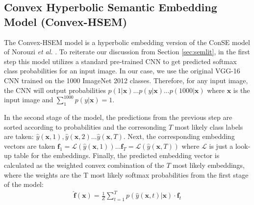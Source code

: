 \documentclass[12pt]{report}
\begin{document}
\subsection{Convex Hyperbolic Semantic Embedding Model (Convex-HSEM)}
The Convex-HSEM model is a hyperbolic embedding version of the ConSE model of Norouzi \textit{et al.} \cite{Norouzi2013}. To reiterate our discussion from Section \ref{sec:semlit}, in the first step this model utilizes a standard pre-trained CNN to get predicted softmax class probabilities for an input image. In our case, we use the original VGG-16 CNN trained on the 1000 ImageNet 2012 classes. Therefore, for any input image, the CNN will output probabilities $p(1|\mathbf{x}) \dots p(y|\mathbf{x}) \dots p(1000|\mathbf{x})$ where $\mathbf{x}$ is the input image and $\sum_1^{1000}p(y|\mathbf{x})=1$.

In the second stage of the model, the predictions from the previous step are sorted according to probabilities and the corresonding $T$ most likely class labels are taken: $\hat{y}(\mathbf{x}, 1),\hat{y}(\mathbf{x}, 2) \dots \hat{y}(\mathbf{x}, T)$. Next, the corresponding embedding vectors are taken $\mathbf{f}_1 = \mathcal{L}(\hat{y}(\mathbf{x}, 1)) \dots \mathbf{f}_T = \mathcal{L}(\hat{y}(\mathbf{x}, T))$ where $\mathcal{L}$ is just a look-up table for the embeddings. Finally, the predicted embedding vector is calculated as the weighted convex combination of the $T$ most likely embeddings, where the weights are the T most likely softmax probabilities from the first stage of the model:
\begin{align}
  \mathbf{\hat{f}(\mathbf{x})} = \frac{1}{Z}\sum_{t=1}^T p(\hat{y}(\mathbf{x}, t)| \mathbf{x}) \cdot \mathbf{f}_t
\end{align}
\end{document}
